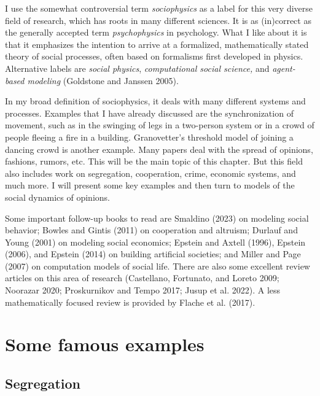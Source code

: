 \documentclass[
  a4paper,
  DIV=11,
  numbers=noendperiod,
  oneside]{scrreprt}
\begin{document}
I use the somewhat controversial term \emph{sociophysics} as a label for
this very diverse field of research, which has roots in many different
sciences. It is as (in)correct as the generally accepted term
\emph{psychophysics} in psychology. What I like about it is that it
emphasizes the intention to arrive at a formalized, mathematically
stated theory of social processes, often based on formalisms first
developed in physics. Alternative labels are \emph{social physics},
\emph{computational social science,} and \emph{agent-based modeling}
(Goldstone and Janssen 2005).

In my broad definition of sociophysics, it deals with many different
systems and processes. Examples that I have already discussed are the
synchronization of movement, such as in the swinging of legs in a
two-person system or in a crowd of people fleeing a fire in a building.
Granovetter's threshold model of joining a dancing crowd is another
example. Many papers deal with the spread of opinions, fashions, rumors,
etc. This will be the main topic of this chapter. But this field also
includes work on segregation, cooperation, crime, economic systems, and
much more. I will present some key examples and then turn to models of
the social dynamics of opinions.

Some important follow-up books to read are Smaldino (2023) on modeling
social behavior; Bowles and Gintis (2011) on cooperation and altruism;
Durlauf and Young (2001) on modeling social economics; Epstein and
Axtell (1996), Epstein (2006), and Epstein (2014) on building artificial
societies; and Miller and Page (2007) on computation models of social
life. There are also some excellent review articles on this area of
research (Castellano, Fortunato, and Loreto 2009; Noorazar 2020;
Proskurnikov and Tempo 2017; Jusup et al. 2022). A less mathematically
focused review is provided by Flache et al. (2017).

\section{Some famous examples}\label{sec-Some-famous-examples}

\subsection{Segregation}\label{sec-Segregation}
\end{document}
